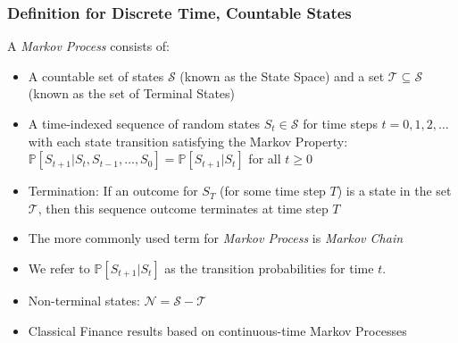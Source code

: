 \documentclass[handout]{beamer}
\begin{document}
\begin{frame}
\frametitle{Definition for Discrete Time, Countable States}
\pause
\begin{definition}
A {\em Markov Process} consists of:
\begin{itemize}
\item A countable set of states $\mathcal{S}$ (known as the State Space) and a set $\mathcal{T} \subseteq \mathcal{S}$ (known as the set of Terminal States)
\item A time-indexed sequence of random states $S_t \in \mathcal{S}$ for time steps $t=0, 1, 2, \ldots$ with each state transition satisfying the Markov Property: $\mathbb{P}[S_{t+1}|S_t, S_{t-1}, \ldots, S_0] = \mathbb{P}[S_{t+1}|S_t]$ for all $t \geq 0$
\item Termination: If an outcome for $S_T$ (for some time step $T$) is a state in the set $\mathcal{T}$, then this sequence outcome terminates at time step $T$
\end{itemize}
\end{definition}
\pause
\begin{itemize}[<+->]
\item The more commonly used term for {\em Markov Process} is {\em Markov Chain}
\item We refer to $\mathbb{P}[S_{t+1}|S_t]$ as the transition probabilities for time $t$.
\item Non-terminal states: $\mathcal{N} = \mathcal{S} - \mathcal{T}$
\item Classical Finance results based on continuous-time Markov Processes
\end{itemize}
\end{frame}
\end{document}
